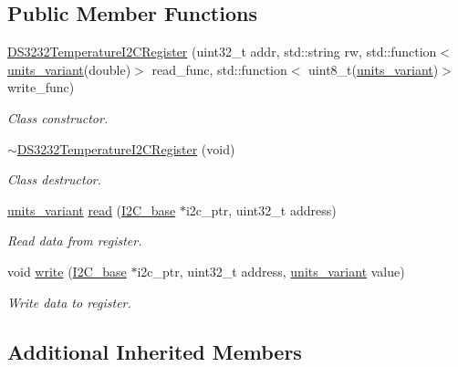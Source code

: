 \subsection*{Public Member Functions}
\begin{DoxyCompactItemize}
\item 
\hyperlink{class_d_s3232_temperature_i2_c_register_a45e6afc23e8218b5b340d89c901441c4}{D\+S3232\+Temperature\+I2\+C\+Register} (uint32\+\_\+t addr, std\+::string rw, std\+::function$<$ \hyperlink{units__define_8hpp_a95d46867fa79633565c288a0b4bd5408}{units\+\_\+variant}(double)$>$ read\+\_\+func, std\+::function$<$ uint8\+\_\+t(\hyperlink{units__define_8hpp_a95d46867fa79633565c288a0b4bd5408}{units\+\_\+variant})$>$ write\+\_\+func)
\begin{DoxyCompactList}\small\item\em Class constructor. \end{DoxyCompactList}\item 
\hyperlink{class_d_s3232_temperature_i2_c_register_a58d1a1797e2d18138a7ee53c4b89036d}{$\sim$\+D\+S3232\+Temperature\+I2\+C\+Register} (void)
\begin{DoxyCompactList}\small\item\em Class destructor. \end{DoxyCompactList}\item 
\hyperlink{units__define_8hpp_a95d46867fa79633565c288a0b4bd5408}{units\+\_\+variant} \hyperlink{class_d_s3232_temperature_i2_c_register_ab8733916ac8d733eb8d0e2b72df4efc2}{read} (\hyperlink{class_i2_c__base}{I2\+C\+\_\+base} $\ast$i2c\+\_\+ptr, uint32\+\_\+t address)
\begin{DoxyCompactList}\small\item\em Read data from register. \end{DoxyCompactList}\item 
void \hyperlink{class_d_s3232_temperature_i2_c_register_a69c3e1c321d2161d8c69e984031d7fc8}{write} (\hyperlink{class_i2_c__base}{I2\+C\+\_\+base} $\ast$i2c\+\_\+ptr, uint32\+\_\+t address, \hyperlink{units__define_8hpp_a95d46867fa79633565c288a0b4bd5408}{units\+\_\+variant} value)
\begin{DoxyCompactList}\small\item\em Write data to register. \end{DoxyCompactList}\end{DoxyCompactItemize}
\subsection*{Additional Inherited Members}


